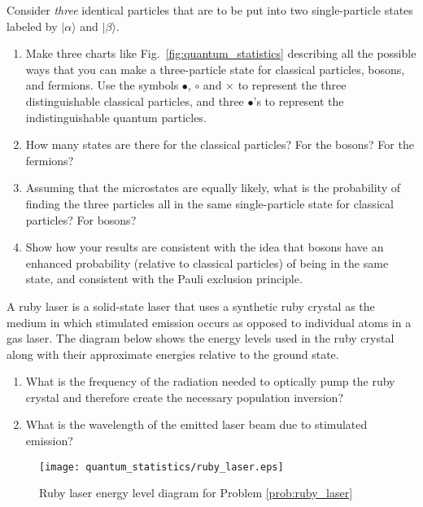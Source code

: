 \begin{problem}
  Consider \textit{three} identical particles that are to be put into
  two single-particle states labeled by $|\alpha\rangle$ and
  $|\beta\rangle$.
  \begin{enumerate}
  \item Make three charts like Fig.~\ref{fig:quantum_statistics}
    describing all the possible ways that you can make a
    three-particle state for classical particles, bosons, and
    fermions.  Use the symbols $\bullet$, $\circ$ and $\times$ to
    represent the three distinguishable classical particles, and three
    $\bullet$'s to represent the indistinguishable quantum particles.
  \item How many states are there for the classical particles?  For
    the bosons?  For the fermions?
  \item Assuming that the microstates are equally likely, what is the
    probability of finding the three particles all in the same
    single-particle state for classical particles?  For bosons?
  \item Show how your results are consistent with the idea that bosons have an
    enhanced probability (relative to classical particles) of being in
    the same state, and consistent with the Pauli exclusion principle.
  \end{enumerate}
\end{problem}


\begin{problem}
\label{prob:ruby_laser}
A ruby laser is a solid-state laser that uses a synthetic ruby crystal
as the medium in which stimulated emission occurs as opposed to
individual atoms in a gas laser.  The diagram below shows the energy
levels used in the ruby crystal along with their approximate energies
relative to the ground state.
\begin{enumerate}
\item What is the frequency of the radiation needed to optically pump
  the ruby crystal and therefore create the necessary population
  inversion?
\item What is the wavelength of the emitted laser beam due to
  stimulated emission?
\end{enumerate}

\begin{figure}[h]
\begin{center}
\texttt{[image: quantum\_statistics/ruby\_laser.eps]}
\caption{Ruby laser energy level diagram for Problem \ref{prob:ruby_laser}}
\label{fig:ruby_laser}
\end{center}
\end{figure}

\end{problem}


